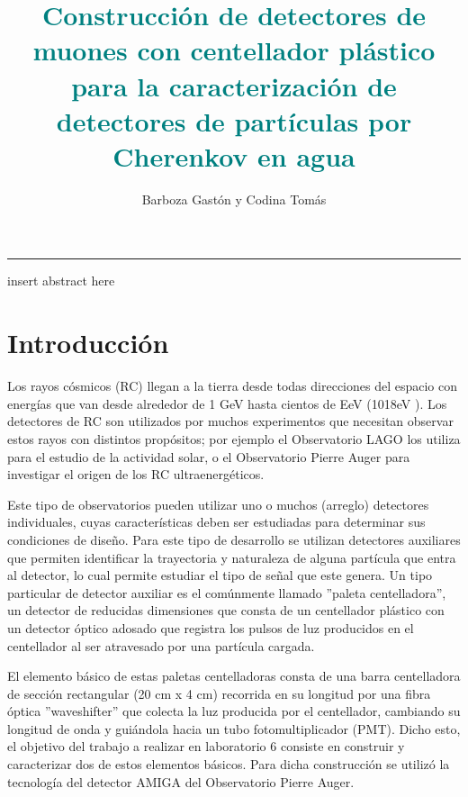 \documentclass[12pt,a4paper]{article}
\title{\vspace{-20pt}\Large{\textbf{\textcolor{teal}{Construcción de detectores de muones con centellador plástico para la caracterización de detectores de partículas por Cherenkov en agua}}}}
\date{}
\author{Barboza Gastón y Codina Tomás}
\affil{Instituto de Astronomía y Física del Espacio FCEyN, UBA}
\affil{barboza.gaston@gmail.com, tomycodina@gmail.com}
\numberwithin{equation}{section}
\begin{document}
\maketitle
\thispagestyle{lab}

\begin{center}
\vspace{-40pt}\rule{\textwidth}{0.2pt}
\end{center}


\begin{boxumen}
insert abstract here
\end{boxumen}

\section{Introducción}


Los rayos cósmicos (RC) llegan a la tierra desde todas direcciones
del espacio con energías que van desde alrededor de 1 GeV hasta cientos
de EeV (1018eV ). Los detectores de RC son utilizados por muchos
experimentos que necesitan observar estos rayos con distintos propósitos;
por ejemplo el Observatorio LAGO los utiliza para el estudio de la
actividad solar, o el Observatorio Pierre Auger para investigar el origen
de los RC ultraenergéticos.

Este tipo de observatorios pueden utilizar
uno o muchos (arreglo) detectores individuales, cuyas características
deben ser estudiadas para determinar sus condiciones de diseño. Para
este tipo de desarrollo se utilizan detectores auxiliares que permiten
identificar la trayectoria y naturaleza de alguna partícula que entra al
detector, lo cual permite estudiar el tipo de señal que este genera. Un
tipo particular de detector auxiliar es el comúnmente llamado ''paleta
centelladora'', un detector de reducidas dimensiones que consta de
un centellador plástico con un detector óptico adosado que registra los
pulsos de luz producidos en el centellador al ser atravesado por una
partícula cargada.

El elemento básico de estas paletas centelladoras consta de una
barra centelladora de sección rectangular (20 cm x 4 cm) recorrida en
su longitud por una fibra óptica ''waveshifter'' que colecta la luz producida por el centellador, cambiando su longitud de onda y guiándola
hacia un tubo fotomultiplicador (PMT). Dicho esto, el objetivo del trabajo a realizar en laboratorio 6 consiste en construir y caracterizar dos de estos elementos básicos. Para dicha construcción se utilizó la tecnología del detector AMIGA del Observatorio Pierre Auger\cite{pierreauger}. 
\end{document}
